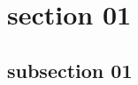 \documentclass[class=book, crop=false]{standalone}
\begin{document}
\section{section 01}

\subsection{subsection 01}

\paragraph*{}
\blindmathpaper\cite{latex2e}
\end{document}

